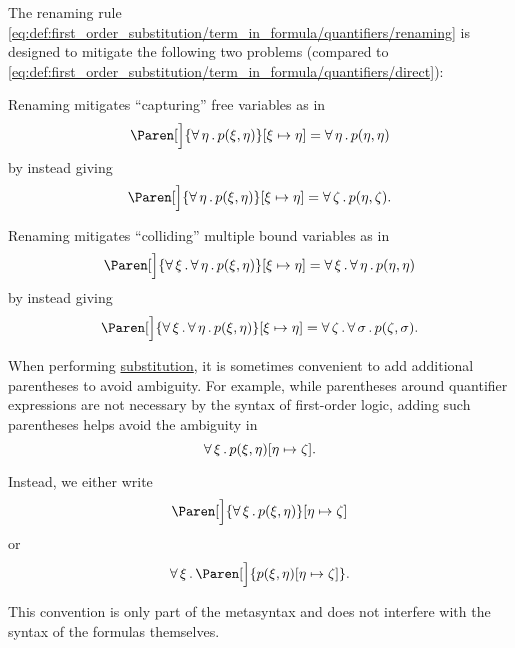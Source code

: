 \begin{remark}\label{rem:first_order_substitution_renaming_justification}
  The renaming rule \eqref{eq:def:first_order_substitution/term_in_formula/quantifiers/renaming} is designed to mitigate the following two problems (compared to \eqref{eq:def:first_order_substitution/term_in_formula/quantifiers/direct}):

  \begin{RemEnum}
     Renaming mitigates \enquote{capturing} free variables as in
    \begin{equation*}
      \Paren[\Big]{ \Qnt{\forall}{\eta} p(\xi, \eta) }[\xi \mapsto \eta] = \Qnt{\forall}{\eta} p(\eta, \eta)
    \end{equation*}
    by instead giving
    \begin{equation*}
      \Paren[\Big]{ \Qnt{\forall}{\eta} p(\xi, \eta) }[\xi \mapsto \eta] = \Qnt{\forall}{\zeta} p(\eta, \zeta).
    \end{equation*}

     Renaming mitigates \enquote{colliding} multiple bound variables as in
    \begin{equation*}
      \Paren[\Big]{ \Qnt{\forall}{\xi} \Qnt{\forall}{\eta} p(\xi, \eta) }[\xi \mapsto \eta] = \Qnt{\forall}{\xi} \Qnt{\forall}{\eta} p(\eta, \eta)
    \end{equation*}
    by instead giving
    \begin{equation*}
      \Paren[\Big]{ \Qnt{\forall}{\xi} \Qnt{\forall}{\eta} p(\xi, \eta) }[\xi \mapsto \eta] = \Qnt{\forall}{\zeta} \Qnt{\forall}{\sigma} p(\zeta, \sigma).
    \end{equation*}
  \end{RemEnum}
\end{remark}

\begin{remark}\label{rem:first_order_substitution_parentheses}
  When performing \hyperref[def:propositional_substitution]{substitution}, it is sometimes convenient to add additional parentheses to avoid ambiguity. For example, while parentheses around quantifier expressions are not necessary by the syntax of first-order logic, adding such parentheses helps avoid the ambiguity in
  \begin{equation*}
    \forall \, \xi \, . \, p(\xi, \eta) [\eta \mapsto \zeta].
  \end{equation*}

  Instead, we either write
  \begin{equation*}
    \Paren[\Big]{ \Qnt{\forall}{\xi} p(\xi, \eta) } [\eta \mapsto \zeta]
  \end{equation*}
  or
  \begin{equation*}
    \Qnt{\forall}{\xi} \Paren[\Big]{ p(\xi, \eta)[\eta \mapsto \zeta] }.
  \end{equation*}

  This convention is only part of the metasyntax and does not interfere with the syntax of the formulas themselves.
\end{remark}

